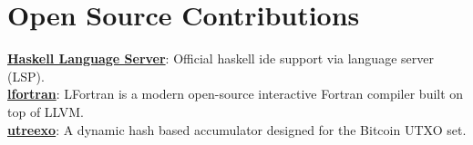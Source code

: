 \documentclass[a4paper,11pt]{article}
\makeatletter
\newcommand{\resumeItem}[1]{
  \item\small{
    {#1 \vspace{-2pt}}
  }
}
\newcommand{\resumeProjectHeading}[2]{
    \item
    \begin{tabular*}{1.001\textwidth}{l@{\extracolsep{\fill}}r}
      \small#1 & \textbf{\small #2}\\
    \end{tabular*}\vspace{-7pt}
}
\newcommand{\resumeSubHeadingListStart}{\begin{itemize}[leftmargin=0.0in, label={}]}
\newcommand{\resumeSubHeadingListEnd}{\end{itemize}}
\newcommand{\resumeItemListStart}{\begin{itemize}}
\newcommand{\resumeItemListEnd}{\end{itemize}\vspace{-5pt}}
\makeatother
\begin{document}

%
\section{Open Source Contributions}
 \begin{itemize}[leftmargin=0.15in, label={}]
    \small{\item{
     \textbf{\href{https://github.com/haskell/haskell-language-server/}{Haskell Language Server}}{: Official haskell ide support via language server (LSP).} \\
     \textbf{\href{https://github.com/lfortran/lfortran}{lfortran}}{: LFortran is a modern open-source interactive Fortran compiler built on top of LLVM.} \\
     \textbf{\href{https://github.com/mit-dci/utreexo}{utreexo}}{: A dynamic hash based accumulator designed for the Bitcoin UTXO set.} \\
    }}
 \end{itemize}
 \vspace{-16pt}
\end{document}
